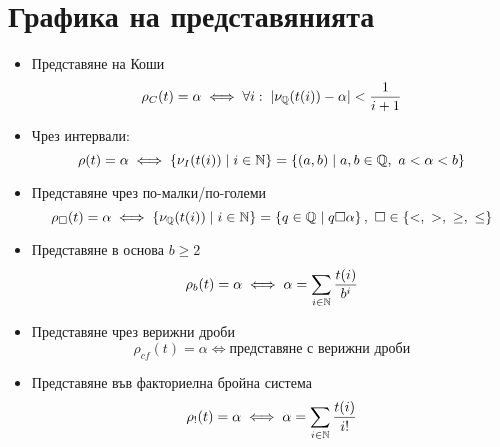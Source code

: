
\ifnotes
    \section{Графика на представянията}
    \begin{itemize}
        \item Представяне на Коши
        \begin{equation}
             \rho_C(t) = \alpha \iff \forall i:\; \left|\nu_{\mathbb{Q}}(t(i)) - \alpha\right| < \frac{1}{i+1}
        \end{equation}
        \item Чрез интервали:
        \begin{equation}
            \rho(t) = \alpha \iff \left\{\nu_I(t(i)) \mid i\in {\mathbb{N}} \right\} = \left\{(a, b) \mid a,b\in{\mathbb{Q}},\ a < \alpha < b\right\}
        \end{equation}
        \item Представяне чрез по-малки/по-големи
         \begin{equation}
            \rho_\square(t) = \alpha \iff \left\{ \nu_\Q(t(i)) \mid i \in \N \right\} =  \left\{ q \in \Q \mid q \square \alpha \right\},\ \square \in \{<,\ >,\ \geq,\ \leq\}
        \end{equation}
        \item Представяне в основа $b \geq 2$
        \begin{equation}
            \rho_b(t) = \alpha \iff \alpha = \sum\limits_{i\in{\mathbb{N}}} \frac{t(i)}{b^i} 
        \end{equation}
        \item Представяне чрез верижни дроби
        \begin{equation}
            \rho_{cf}(t) = \alpha \iff \text{представяне с верижни дроби}
        \end{equation}
        \item Представяне във факториелна бройна система
        \begin{equation}
            \rho_!(t) = \alpha \iff \alpha = \sum\limits_{i\in{\mathbb{N}}} \frac{t(i)}{i!} 
        \end{equation}
    \end{itemize}

